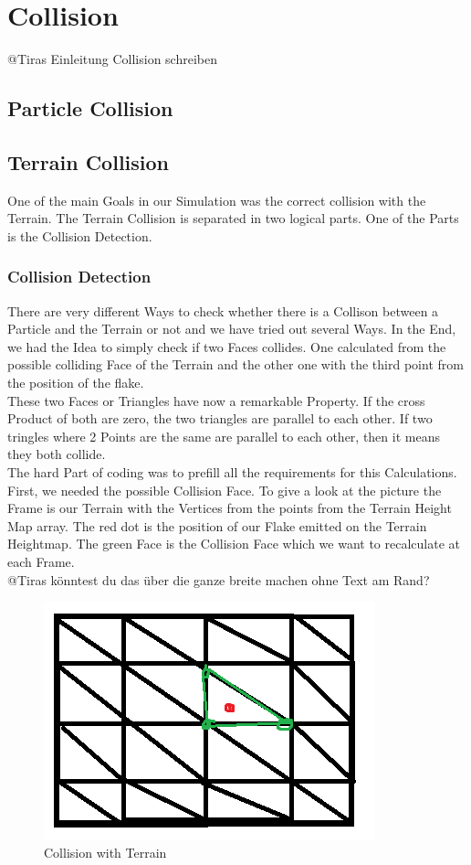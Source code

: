 \documentclass{sig-alternate-05-2015}
\begin{document}
\section{Collision}
@Tiras Einleitung Collision schreiben
\subsection{Particle Collision}
\subsection{Terrain Collision}
One of the main Goals in our Simulation was the correct collision with the Terrain. The Terrain Collision is separated in two logical parts. One of the Parts is the Collision Detection.\\
\subsubsection{Collision Detection}
There are very different Ways to check whether there is a Collison between a Particle and the Terrain or not and we have tried out several Ways. In the End, we had the Idea to simply check if two Faces collides. One calculated from the possible colliding Face of the Terrain and the other one with the third point from the position of the flake. \\
These two Faces or Triangles have now a remarkable Property. If the cross Product of both are zero, the two triangles are parallel to each other. If two tringles where 2 Points are the same are parallel to each other, then it means they both collide. \\
The hard Part of coding was to prefill all the requirements for this Calculations.\\
First, we needed the possible Collision Face. To give a look at the picture the Frame is our Terrain with the Vertices from the points from the Terrain Height Map array. The red dot is the position of our Flake emitted on the Terrain Heightmap. The green Face is the Collision Face which we want to recalculate at each Frame. \\
@Tiras könntest du das über die ganze breite machen ohne Text am Rand? 
\begin{figure}
  \begin{center}
\includegraphics[scale=0.5]{CollisionTerrain.png}
  \end{center}
  \caption{Collision with Terrain}
\end{figure}
\end{document}
